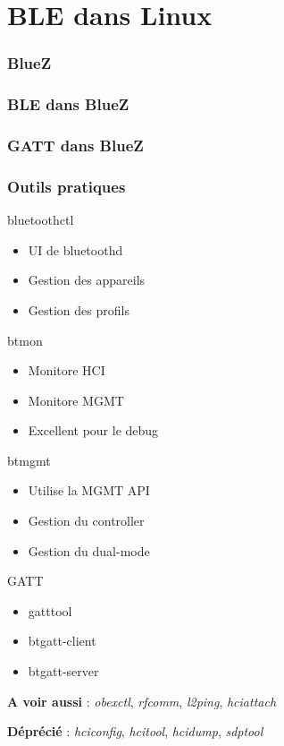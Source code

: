 \section{BLE dans Linux}

\begin{frame}
	\frametitle{BlueZ}
\end{frame}

\begin{frame}
	\frametitle{BLE dans BlueZ}
\end{frame}

\begin{frame}
	\frametitle{GATT dans BlueZ}
\end{frame}

\begin{frame}
	\frametitle{Outils pratiques}
	\begin{minipage}{0.46\linewidth}
		\begin{block}{bluetoothctl}
			\begin{itemize}
				\item UI de bluetoothd
				\item Gestion des appareils
				\item Gestion des profils
			\end{itemize}
		\end{block}
		\begin{block}{btmon}
			\begin{itemize}
				\item Monitore HCI
				\item Monitore MGMT
				\item Excellent pour le debug
			\end{itemize}
		\end{block}
	\end{minipage}
	\begin{minipage}{0.46\linewidth}
		\begin{block}{btmgmt}
			\begin{itemize}
				\item Utilise la MGMT API
				\item Gestion du controller
				\item Gestion du dual-mode
			\end{itemize}
		\end{block}
		\begin{block}{GATT}
			\begin{itemize}
				\item gatttool
				\item btgatt-client
				\item btgatt-server
			\end{itemize}
		\end{block}
	\end{minipage}
	\vspace{0.5cm}
	\small{

	\textbf{A voir aussi} : \textit{obexctl}, \textit{rfcomm}, \textit{l2ping}, \textit{hciattach}

	\textbf{Déprécié} : \textit{hciconfig}, \textit{hcitool}, \textit{hcidump}, \textit{sdptool}
	}

\end{frame}
